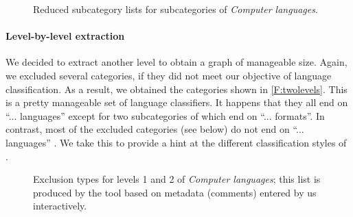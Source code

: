 \begin{figure}[t!]
\begin{center}
{\small
{}}
\end{center}
\vspace{-42\in}
\caption{Reduced subcategory lists for subcategories of \emph{Computer languages}.}
\label{F:twolevels}
\vspace{-42\in}
\end{figure}


\vspace{-27\in}

\paragraph*{\textbf{Level-by-level extraction}}

We decided to extract another level to obtain a graph of manageable size. Again, we excluded several categories, if they did not meet our objective of language classification. As a result, we obtained the categories shown in \autoref{F:twolevels}. This is a pretty manageable set of language classifiers. 
It happens that they all end on ``... languages'' except for two subcategories of  which end on ``... formats''. In contrast, most of the excluded categories (see below) do not end on ``... languages'' . We take this to provide a hint at the different classification styles of \Wikipedia.


\begin{figure}[t!]
\begin{center}
{\small
{}}
\end{center}
\vspace{-42\in}
\caption{Exclusion types for levels 1 and 2 of \emph{Computer languages}; this list is produced by the \WikiTax{} tool based on metadata (comments) entered by us interactively.}
\label{F:metaclassify}
\vspace{-42\in}
\end{figure}

